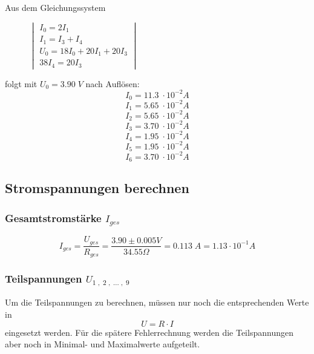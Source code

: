 \documentclass[a4paper,12pt]{article}
\begin{document}
Aus dem Gleichungssystem \\

\begin{figure}[H]
\centering
$\begin{vmatrix}
I_0 = 2I_1 \\
I_1 = I_3 + I_4 \\
U_0 = 18I_0 + 20I_1 + 20I_3\\
38I_4 = 20I_3
\end{vmatrix}$\\
\end{figure}

folgt mit $U_0 = 3.90\; V$ nach Auflösen:\\

$$I_0 = 11.3\; \cdot 10^{-2}A$$
$$I_1 = 5.65\; \cdot 10^{-2} A$$
$$I_2 = 5.65\; \cdot 10^{-2} A$$
$$I_3 = 3.70\; \cdot 10^{-2} A$$
$$I_4 = 1.95\; \cdot 10^{-2} A$$
$$I_5 = 1.95\; \cdot 10^{-2} A$$
$$I_6 = 3.70\; \cdot 10^{-2} A$$

\subsection{Stromspannungen berechnen}

\subsubsection{Gesamtstromstärke $I_{ges}$}

$$I_{ges} = \frac{U_{ges}}{R_{ges}} = \frac{3.90 \pm 0.005 V}{34.55\Omega} = 0.113 \;A = 1.13 \cdot 10^{-1} A$$

\subsubsection{Teilspannungen $U_{1\;,\;2\;,\; ...\;,\; 9}$}

Um die Teilspannungen zu berechnen, müssen nur noch die entsprechenden Werte in $$U = R \cdot I$$ eingesetzt werden. Für die spätere Fehlerrechnung werden die Teilspannungen aber noch in Minimal- und Maximalwerte aufgeteilt.\\
\end{document}
